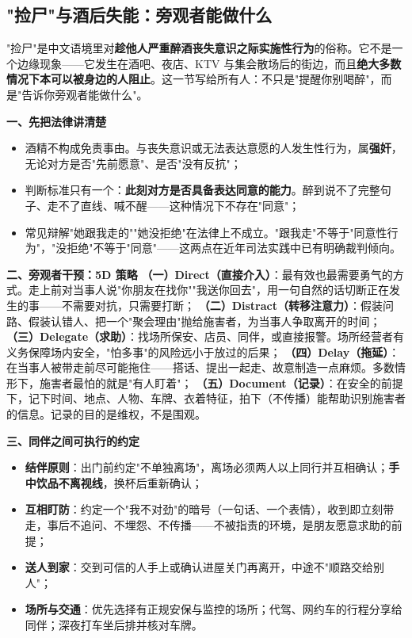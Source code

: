 \subsection{"捡尸"与酒后失能：旁观者能做什么}

"捡尸"是中文语境里对\textbf{趁他人严重醉酒丧失意识之际实施性行为}的俗称。它不是一个边缘现象——它发生在酒吧、夜店、KTV 与集会散场后的街边，而且\textbf{绝大多数情况下本可以被身边的人阻止}。这一节写给所有人：不只是"提醒你别喝醉"，而是"告诉你旁观者能做什么"。

\textbf{一、先把法律讲清楚}
\begin{itemize}
\item 酒精不构成免责事由。与丧失意识或无法表达意愿的人发生性行为，属\textbf{强奸}，无论对方是否"先前愿意"、是否"没有反抗"；
\item 判断标准只有一个：\textbf{此刻对方是否具备表达同意的能力}。醉到说不了完整句子、走不了直线、喊不醒——这种情况下不存在"同意"；
\item 常见辩解"她跟我走的""她没拒绝"在法律上不成立。"跟我走"不等于"同意性行为"，"没拒绝"不等于"同意"——这两点在近年司法实践中已有明确裁判倾向。
\end{itemize}

\textbf{二、旁观者干预：5D 策略}
\textbf{（一）Direct（直接介入）}：最有效也最需要勇气的方式。走上前对当事人说"你朋友在找你""我送你回去"，用一句自然的话切断正在发生的事——不需要对抗，只需要打断；
\textbf{（二）Distract（转移注意力）}：假装问路、假装认错人、把一个"聚会理由"抛给施害者，为当事人争取离开的时间；
\textbf{（三）Delegate（求助）}：找场所保安、店员、同伴，或直接报警。场所经营者有义务保障场内安全，"怕多事"的风险远小于放过的后果；
\textbf{（四）Delay（拖延）}：在当事人被带走前尽可能拖住——搭话、提出一起走、故意制造一点麻烦。多数情形下，施害者最怕的就是"有人盯着"；
\textbf{（五）Document（记录）}：在安全的前提下，记下时间、地点、人物、车牌、衣着特征，拍下（不传播）能帮助识别施害者的信息。记录的目的是维权，不是围观。

\textbf{三、同伴之间可执行的约定}
\begin{itemize}
\item \textbf{结伴原则}：出门前约定"不单独离场"，离场必须两人以上同行并互相确认；\textbf{手中饮品不离视线}，换杯后重新确认；
\item \textbf{互相盯防}：约定一个"我不对劲"的暗号（一句话、一个表情），收到即立刻带走，事后不追问、不埋怨、不传播——不被指责的环境，是朋友愿意求助的前提；
\item \textbf{送人到家}：交到可信的人手上或确认进屋关门再离开，中途不"顺路交给别人"；
\item \textbf{场所与交通}：优先选择有正规安保与监控的场所；代驾、网约车的行程分享给同伴；深夜打车坐后排并核对车牌。
\end{itemize}

